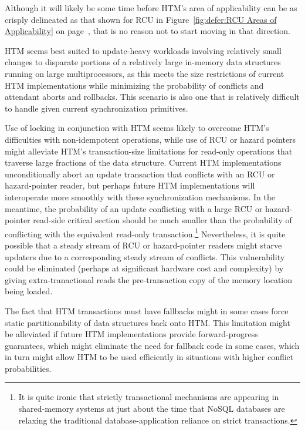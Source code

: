 Although it will likely be some time before HTM's area of applicability
can be as crisply delineated as that shown for RCU in
Figure~\ref{fig:defer:RCU Areas of Applicability} on
page~\pageref{fig:defer:RCU Areas of Applicability}, that is no reason not to
start moving in that direction.

HTM seems best suited to update-heavy workloads involving relatively
small changes to disparate portions of a relatively large in-memory
data structures running on large multiprocessors,
as this meets the size restrictions of current HTM implementations while
minimizing the probability of conflicts and attendant aborts and
rollbacks.
This scenario is also one that is relatively difficult to handle given
current synchronization primitives.

Use of locking in conjunction with HTM seems likely to overcome HTM's
difficulties with non-idempotent operations, while use of RCU or
hazard pointers might alleviate HTM's transaction-size limitations
for read-only operations that traverse large fractions of the data
structure.
Current HTM implementations unconditionally abort an update transaction
that conflicts with an RCU or hazard-pointer reader, but perhaps future
HTM implementations will interoperate more smoothly with these
synchronization mechanisms.
In the meantime, the probability of an update conflicting with a
large RCU or hazard-pointer read-side critical section should be
much smaller than the probability of conflicting with the equivalent
read-only transaction.\footnote{
	It is quite ironic that strictly transactional mechanisms are
	appearing in shared-memory systems at just about the time
	that NoSQL databases are relaxing the traditional
	database-application reliance on strict transactions.}
Nevertheless, it is quite possible that a steady stream of RCU or
hazard-pointer readers might starve updaters due to a corresponding
steady stream of conflicts.
This vulnerability could be eliminated (perhaps at significant
hardware cost and complexity) by giving extra-tranactional
reads the pre-transaction copy of the memory location being loaded.

The fact that HTM transactions must have fallbacks might in some cases
force static partitionability of data structures back onto HTM.
This limitation might be alleviated if future HTM implementations
provide forward-progress guarantees, which might eliminate the need
for fallback code in some cases, which in turn might allow HTM to
be used efficiently in situations with higher conflict probabilities.

